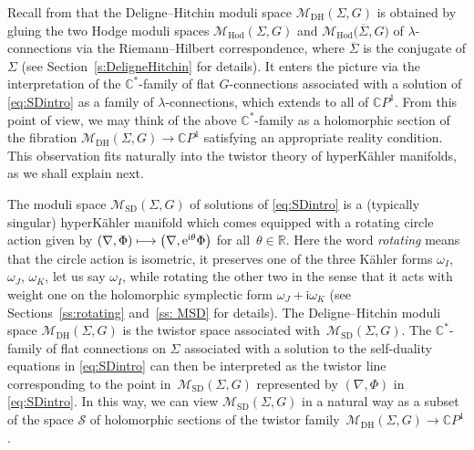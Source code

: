 \documentclass[pdftex]{sigma}
\numberwithin{equation}{section}
\theoremstyle{definition}
\newcommand\C{{\mathbb C}}
\renewcommand{\i}{\mathsf{i}}
\begin{document}
Recall from \cite{Si-Hodge} that the Deligne--Hitchin moduli space $\mathcal{M}_{\mathrm{DH}}(\Sigma, G)$ is obtained by gluing the
two Hodge moduli spaces $\mathcal{M}_{\mathrm{Hod}}(\Sigma, G)$ and $\mathcal{M}_{\mathrm{Hod}}\bigl(\overline{\Sigma}, G\bigr)$ of $\lambda$-connections via the Riemann--Hilbert correspondence, where $\overline{\Sigma}$ is the conjugate of
$\Sigma$ (see Section~\ref{s:DeligneHitchin} for details). It enters the picture via the interpretation
of the $\C^*$-family of flat $G$-connections associated with a solution of \eqref{eq:SDintro} as a family of
$\lambda$-connections, which extends to all of $\C P^1$. From this point of view, we may think of the above
$\C^*$-family as a holomorphic section of the fibration $\mathcal{M}_{\mathrm{DH}}(\Sigma, G) \longrightarrow \C P^1$ satisfying an
appropriate reality condition. This observation fits naturally into the twistor theory of hyperK\"ahler
manifolds, as we shall explain next.

The moduli space $\mathcal{M}_{\mathrm{SD}}(\Sigma, G)$ of solutions of \eqref{eq:SDintro} is a (typically singular) hyperK\"ahler mani\-fold which
comes equipped with a rotating circle action given by $(\nabla, \Phi) \longmapsto
\bigl(\nabla, {\rm e}^{{\rm i}\theta}\Phi\bigr)$ for all~${\theta \in \mathbb R}$. Here the word
\emph{rotating} means that the circle action is isometric, it preserves one of the three K\"ahler forms $\omega_I$, $\omega_J$, $\omega_K$, let us say $\omega_I$,
while rotating
the other two in the sense that it acts with weight one on the holomorphic symplectic form $\omega_J+\i \omega_K$ (see Sections~\ref{ss:rotating} and~\ref{ss: MSD} for details). The Deligne--Hitchin moduli
space $\mathcal{M}_{\mathrm{DH}}(\Sigma, G)$ is the twistor space associated with~$\mathcal{M}_{\mathrm{SD}}(\Sigma, G)$. The $\C^*$-family of flat
connections on $\Sigma$ associated with a solution to the self-duality equations
in \eqref{eq:SDintro} can then be interpreted as the twistor line corresponding to the point in~$\mathcal{M}_{\mathrm{SD}}(\Sigma, G)$
represented by $(\nabla, \Phi)$ in \eqref{eq:SDintro}. In this way, we can view $\mathcal{M}_{\mathrm{SD}}(\Sigma, G)$ in a natural
way as a subset of the space $\mathcal S$ of holomorphic sections of the twistor family~$\mathcal{M}_{\mathrm{DH}}(\Sigma, G) \longrightarrow
\C P^1$.
\end{document}
